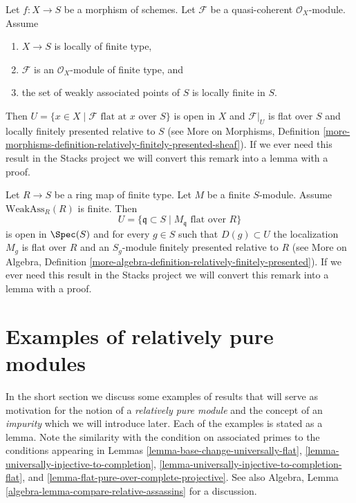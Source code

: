 \begin{remark}
\label{remark-finite-type-flat}
Let $f : X \to S$ be a morphism of schemes.
Let $\mathcal{F}$ be a quasi-coherent $\mathcal{O}_X$-module.
Assume
\begin{enumerate}
\item $X \to S$ is locally of finite type,
\item $\mathcal{F}$ is an $\mathcal{O}_X$-module of finite type, and
\item the set of weakly associated points of $S$ is locally finite in $S$.
\end{enumerate}
Then $U = \{x \in X \mid \mathcal{F}\text{ flat at }x\text{ over }S\}$
is open in $X$ and $\mathcal{F}|_U$ is flat over $S$ and locally
finitely presented relative to $S$ (see
More on Morphisms, Definition
\ref{more-morphisms-definition-relatively-finitely-presented-sheaf}).
If we ever need this result in the Stacks project we will convert
this remark into a lemma with a proof.
\end{remark}

\begin{remark}
\label{remark-finite-type-flat-algebra}
Let $R \to S$ be a ring map of finite type.
Let $M$ be a finite $S$-module.
Assume $\text{WeakAss}_R(R)$ is finite.
Then
$$
U = \{\mathfrak q \subset S \mid M_{\mathfrak q}\text{ flat over }R\}
$$
is open in $\Spec(S)$ and for every $g \in S$ such that
$D(g) \subset U$ the localization $M_g$ is flat over $R$ and
an $S_g$-module finitely presented relative to $R$ (see
More on Algebra, Definition
\ref{more-algebra-definition-relatively-finitely-presented}).
If we ever need this result in the Stacks project we will convert
this remark into a lemma with a proof.
\end{remark}








\section{Examples of relatively pure modules}
\label{section-examples-pure-modules}

\noindent
In the short section we discuss some examples of results that will serve
as motivation for the notion of a {\it relatively pure module} and the
concept of an {\it impurity} which we will introduce later. Each of the
examples is stated as a lemma. Note the similarity with the condition on
associated primes to the conditions appearing in
Lemmas \ref{lemma-base-change-universally-flat},
\ref{lemma-universally-injective-to-completion},
\ref{lemma-universally-injective-to-completion-flat}, and
\ref{lemma-flat-pure-over-complete-projective}.
See also
Algebra, Lemma \ref{algebra-lemma-compare-relative-assassins}
for a discussion.

